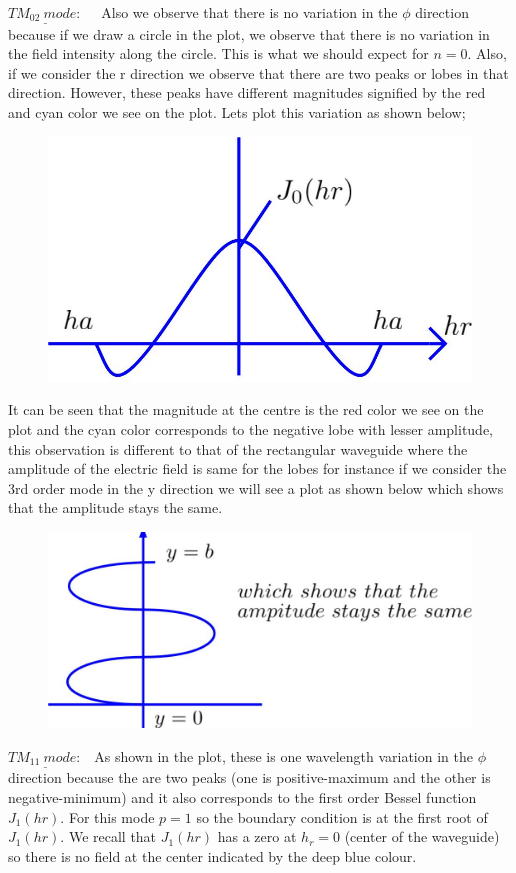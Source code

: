 $\underline{TM_{02} \ mode:}$ \ \ Also we observe that there is no variation in the $\phi$ direction because if we draw a circle in the plot, we observe that there is no variation in the field intensity along the circle. This is what we should expect for $n =0$. Also, if we consider the r direction we observe that there are two peaks or lobes in that direction. However, these peaks have different magnitudes signified by the red and cyan color we see on the plot. Lets plot this variation as shown below;
\begin{figure}[h]
\centering
\includegraphics[width=0.7\linewidth]{./graphics/m2}
\caption{}
\label{fig:m2}
\end{figure}
It can be seen that the magnitude at the centre is the red color we see on the plot and the cyan color corresponds to the negative lobe with lesser amplitude, this observation is different to that of the rectangular waveguide where the amplitude of the  electric field is same for the lobes for instance if we consider the 3rd order mode in the y direction we will see a plot as shown below which shows that the amplitude stays the same.
\begin{figure}[h]
\centering
\includegraphics[width=1\linewidth]{./graphics/m3}
\caption{}
\label{fig:m3}
\end{figure}
$\underline{TM_{11} \ mode:}$ \ As shown in the plot, these is one wavelength variation in the $\phi$ direction because the are two peaks (one is positive-maximum and the other is negative-minimum) and it also corresponds to the first order Bessel function $J_1(hr)$. For this mode $p =1$  so the boundary condition is at the first root of $J_1(hr).$ We recall that $J_1(hr)$ has a zero at $h_r =0$ (center of the waveguide) so there is no field  at the center indicated by the deep blue colour.

